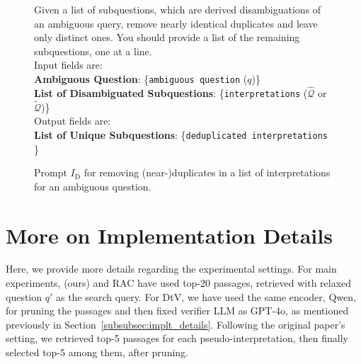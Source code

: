 \begin{figure*}[!htbp]
\centering
\begin{tcolorbox}[boxrule=0pt, title=Evaluation Prompt for Deduplication]
Given a list of subquestions, which are derived disambiguations of an ambiguous query,
remove nearly identical duplicates and leave only distinct ones.
You should provide a list of the remaining subquestions, one at a line.\\

Input fields are:\\
\textbf{Ambiguous Question}: \{\texttt{ambiguous question} ($q$)\}\\
\textbf{List of Disambiguated Subquestions}: \{\texttt{interpretations} ($\hat{\mathcal{Q}}$ or $\tilde{\mathcal{Q}}$)\}\\

Output fields are:\\
\textbf{List of Unique Subquestions}:  \{\texttt{deduplicated interpretations} \} \\
\end{tcolorbox}
\caption{Prompt $I_{\textrm{D}}$ for removing (near-)duplicates in a list of interpretations for an ambiguous question.}
\label{fig:prompt_dedup}
\end{figure*}


\section{More on Implementation Details}
\label{app:impl_details}

Here, we provide more details regarding the experimental settings.
For main experiments, \ours (ours) and RAC have used top-20 passages, retrieved with relaxed question $q'$ as the search query.
For DtV, we have used the same encoder, Qwen, for pruning the passages and then fixed verifier LLM as GPT-4o, as mentioned previously in Section~\ref{subsubsec:implt_details}.
Following the original paper's setting, we retrieved top-5 passages for each pseudo-interpretation, then finally selected top-5 among them, after pruning.
